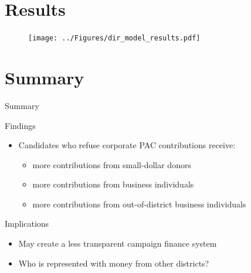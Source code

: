 \documentclass[12pt, aspectratio=169]{beamer}
\begin{document}
\section{Results}

\begin{frame}
	\begin{figure}
		\centering
		\texttt{[image: ../Figures/dir\_model\_results.pdf]}
	\end{figure}
\end{frame}


\section{Summary}

\begin{frame}{Summary}

Findings
	\begin{itemize}
		\item Candidates who refuse corporate PAC contributions receive:
		\begin{itemize}
			\item more contributions from small-dollar donors \pause
			\item more contributions from business individuals \pause
			\item more contributions from out-of-district business individuals \pause
		\end{itemize}
	\end{itemize}
	
Implications \pause
	\begin{itemize}
		\item May create a less transparent campaign finance system \pause
		\item Who is represented with money from other districts?
	\end{itemize}
\end{frame}
\end{document}
